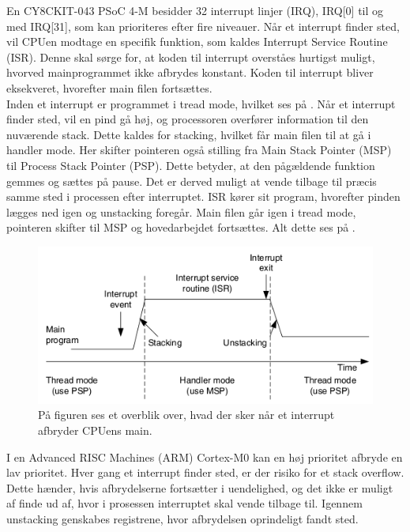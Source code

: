 En CY8CKIT-043 PSoC 4-M besidder 32 interrupt linjer (IRQ), IRQ[0] til og med IRQ[31], som kan prioriteres efter fire niveauer. %
Når et interrupt finder sted, vil CPUen modtage en specifik funktion, som kaldes Interrupt Service Routine (ISR). Denne skal sørge for, at koden til interrupt overståes hurtigst muligt, hvorved mainprogrammet ikke afbrydes konstant. Koden til interrupt bliver eksekveret, hvorefter main filen fortsættes. \citep{Badiger2016}\\
Inden et interrupt er programmet i tread mode, hvilket ses på . Når et interrupt finder sted, vil en pind gå høj, og processoren overfører information til den nuværende stack. Dette kaldes for stacking, hvilket får main filen til at gå i handler mode. Her skifter pointeren også stilling fra Main Stack Pointer (MSP) til Process Stack Pointer (PSP). Dette betyder, at den pågældende funktion gemmes og sættes på pause. Det er derved muligt at vende tilbage til præcis samme sted i processen efter interruptet. ISR kører sit program, hvorefter pinden lægges ned igen og unstacking foregår. Main filen går igen i tread mode, pointeren skifter til MSP og hovedarbejdet fortsættes. Alt dette ses på . \citep{Badiger2016,Tanenbaum2006}
\begin{figure}[H]
	\centering
	\includegraphics[scale=0.68]{figures/bProblemloesning/interrupt.png}
	\caption{På figuren ses et overblik over, hvad der sker når et interrupt afbryder CPUens main. \citep{Tanenbaum2006}}
	\label{fig:interrupt}
\end{figure}\vspace{-0.5cm}
I en Advanced RISC Machines (ARM) Cortex-M0 kan en høj prioritet afbryde en lav prioritet. Hver gang et interrupt finder sted, er der risiko for et stack overflow. Dette hænder, hvis afbrydelserne fortsætter i uendelighed, og det ikke er muligt af finde ud af, hvor i prosessen interruptet skal vende tilbage til. %
Igennem unstacking genskabes registrene, hvor afbrydelsen oprindeligt fandt sted. \citep{Badiger2016}

